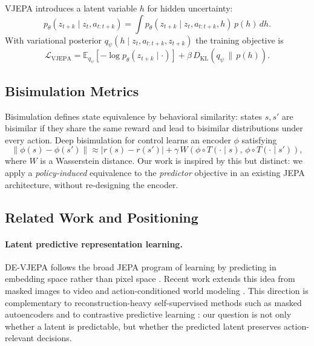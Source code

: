 \documentclass[10pt,twocolumn]{article}
\theoremstyle{tightstyle}
\begin{document}
VJEPA \citep{huang2026vjepa} introduces a latent variable $h$ for hidden uncertainty:
\[
  p_\theta(z_{t+k} \mid z_t, a_{t:t+k}) = \int p_\theta(z_{t+k} \mid z_t, a_{t:t+k}, h)\,p(h)\,dh.
\]
With variational posterior $q_\psi(h \mid z_t, a_{t:t+k}, z_{t+k})$ the training objective is
\begin{equation}
  \mathcal{L}_{\text{VJEPA}}
  = \mathbb{E}_{q_\psi}\!\left[-\log p_\theta(z_{t+k} \mid \cdot)\right]
  + \beta\,D_{\mathrm{KL}}\!\left(q_\psi \,\|\, p(h)\right).
  \label{eq:vjepa}
\end{equation}

\subsection{Bisimulation Metrics}
\label{sec:bisim}

Bisimulation \citep{ferns2004metrics} defines state equivalence by behavioral
similarity: states $s,s'$ are bisimilar if they share the same reward and lead to
bisimilar distributions under every action.
Deep bisimulation for control \citep{zhang2020learning} learns an encoder $\phi$
satisfying
\[
  \|\phi(s)-\phi(s')\| \approx |r(s)-r(s')| + \gamma\,W(\phi \circ T(\cdot\mid s),\,\phi \circ T(\cdot\mid s')),
\]
where $W$ is a Wasserstein distance.
Our work is inspired by this but distinct: we apply a \emph{policy-induced} equivalence
to the \emph{predictor} objective in an existing JEPA architecture, without re-designing
the encoder.


\subsection{Related Work and Positioning}
\label{sec:related}

\paragraph{Latent predictive representation learning.}
DE-VJEPA follows the broad JEPA program of learning by predicting in embedding
space rather than pixel space \citep{lecun2022path,assran2023ijepa,bardes2024vjepa}.
Recent work extends this idea from masked images to video and action-conditioned
world modeling \citep{garrido2024iwm,assran2025vjepa2,destrade2026valuejepa}.
This direction is complementary to reconstruction-heavy self-supervised methods
such as masked autoencoders \citep{he2022mae} and to contrastive predictive
learning \citep{oord2018cpc}: our question is not only whether a latent is
predictable, but whether the predicted latent preserves action-relevant decisions.
\end{document}
